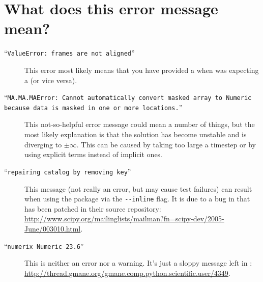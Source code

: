 
    \section{What does this error message mean?}\hspace*{\fill}
    
        \begin{description}
            
            \item[``\texttt{ValueError: frames are not aligned}'']
            
            This error most likely means that you have provided a
             when \FiPy{} was expecting a
             (or vice versa).

            \item[``\texttt{MA.MA.MAError: Cannot automatically
            convert masked array to Numeric because data is masked in one or
            more locations.}'']
            
            This not-so-helpful error message could mean a number of things,
            but the most likely explanation is that the solution has become
            unstable and is diverging to $\pm\infty$.  This can be caused by
            taking too large a timestep or by using explicit terms instead of
            implicit ones.
            
            \item[``\texttt{repairing catalog by removing key}'']
            
            This message (not really an error, but may cause test 
            failures) can result when using the \SciPy{} \weave{} 
            package via the \verb+--inline+ flag. It is due to a bug
            in \SciPy{} that has been patched in their source 
            repository: \url{http://www.scipy.org/mailinglists/mailman?fn=scipy-dev/2005-June/003010.html}.
            
            \item[``\texttt{numerix Numeric 23.6}'']
            
            This is neither an error nor a warning. It's just a sloppy 
            message left in \SciPy{}:
            \url{http://thread.gmane.org/gmane.comp.python.scientific.user/4349}.
            
        \end{description}
        
